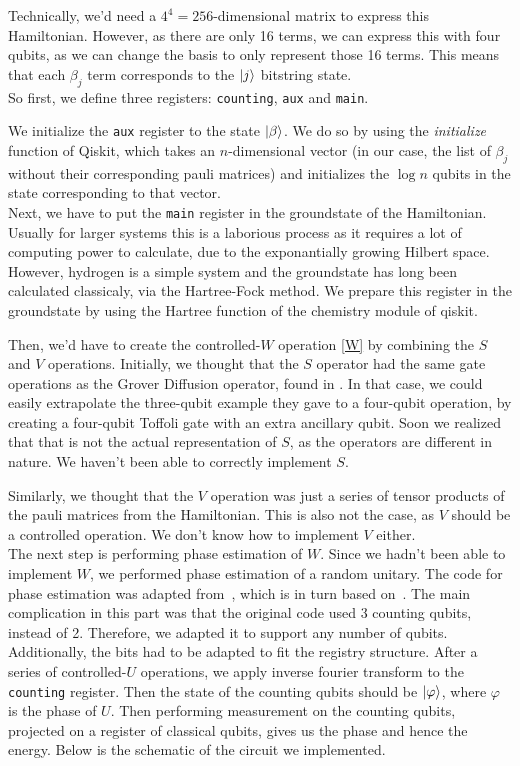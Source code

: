 \documentclass{article}
\begin{document}
Technically, we'd need a $4^4 = 256$-dimensional matrix to express this Hamiltonian. However, as there are only 16 terms, we can express this with four qubits, as we can change the basis to only represent those 16 terms.  This means that each $\beta_j$ term corresponds to the $\ket{j}$ bitstring state. \\

So first, we define three registers:  \verb|counting|, \verb|aux| and \verb|main|.

We initialize the \verb|aux| register to the state $\ket{\beta}$. We do so by using the \textit{initialize} function of Qiskit, which takes an $n$-dimensional vector (in our case, the list of $\beta_j$ without their corresponding pauli matrices) and initializes the $\log{n}$  qubits in the state corresponding to that vector. \\

Next, we have to put the \verb|main| register in the groundstate of the Hamiltonian. Usually for larger systems this is a laborious process as it requires a lot of computing power to calculate, due to the exponantially growing Hilbert space. However, hydrogen is a simple system and the groundstate has long been calculated classicaly, via the Hartree-Fock method. We prepare this register in the groundstate by using the Hartree function of the chemistry module of qiskit.

Then, we'd have to create the controlled-$W$ operation \ref{W} by combining the $S$ and $V$ operations. Initially, we thought that the $S$ operator had the same gate operations as the Grover Diffusion operator, found in \cite{Qiskit-Textbook}. In that case, we could easily extrapolate the three-qubit example they gave to a four-qubit operation, by creating a four-qubit Toffoli gate with an extra ancillary qubit. Soon we realized that that is not the actual representation of $S$, as the operators are different in nature. We haven't been able to correctly implement $S$.

Similarly, we thought that the $V$ operation was just a series of tensor products of the pauli matrices from the Hamiltonian. This is also not the case, as $V$ should be a controlled operation. We don't know how to implement $V$ either. \\

The next step is performing phase estimation of $W$. Since we hadn't been able to implement $W$, we performed phase estimation of a random unitary. The code for phase estimation was adapted from~\cite{Qiskit-Textbook}, which is in turn based on~\textcite{nielsen}. The main complication in this part was that the original code used 3 counting qubits, instead of 2. Therefore, we adapted it to support any number of qubits. Additionally, the bits had to be adapted to fit the registry structure. After a series of controlled-$U$ operations, we apply inverse fourier transform to the \verb|counting| register. Then the state of the counting qubits should be $\ket{\varphi}$, where $\varphi$ is the phase of $U$. Then performing measurement on the counting qubits, projected on a register of classical qubits, gives us the phase and hence the energy. Below is the schematic of the circuit we implemented.
\end{document}

